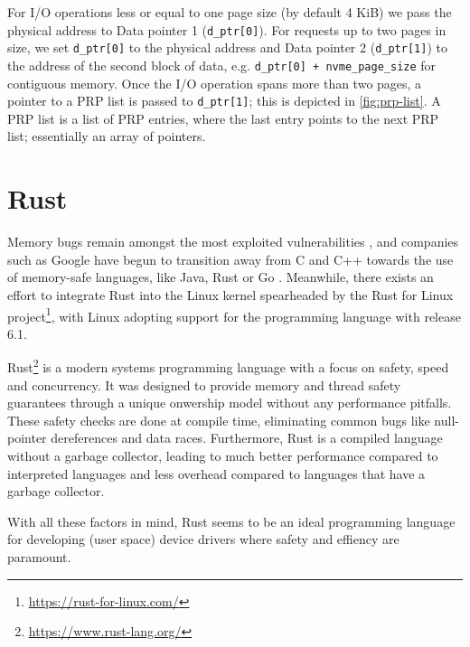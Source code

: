 For I/O operations less or equal to one page size (by default 4 KiB) we pass the physical address to Data pointer 1 (\texttt{d\_ptr[0]}). For requests up to two pages in size, we set \texttt{d\_ptr[0]} to the physical address and Data pointer 2 (\texttt{d\_ptr[1]}) to the address of the second block of data, e.g. \texttt{d\_ptr[0] + nvme\_page\_size} for contiguous memory. Once the I/O operation spans more than two pages, a pointer to a PRP list is passed to \texttt{d\_ptr[1]}; this is depicted in \autoref{fig:prp-list}. A PRP list is a list of PRP entries, where the last entry points to the next PRP list; essentially an array of pointers.

\section{Rust}
Memory bugs remain amongst the most exploited vulnerabilities \cite{mitre}, and companies such as Google have begun to transition away from C and C++ towards the use of memory-safe languages, like Java, Rust or Go \cite{google}. Meanwhile, there exists an effort to integrate Rust into the Linux kernel spearheaded by the Rust for Linux project\footnote{\url{https://rust-for-linux.com/}}, with Linux adopting support for the programming language with release 6.1.

Rust\footnote{\url{https://www.rust-lang.org/}} is a modern systems programming language with a focus on safety, speed and concurrency. It was designed to provide memory and thread safety guarantees through a unique onwership model without any performance pitfalls. These safety checks are done at compile time, eliminating common bugs like null-pointer dereferences and data races. Furthermore, Rust is a compiled language without a garbage collector, leading to much better performance compared to interpreted languages and less overhead compared to languages that have a garbage collector.

With all these factors in mind, Rust seems to be an ideal programming language for developing (user space) device drivers where safety and effiency are paramount.


